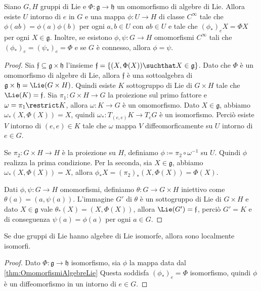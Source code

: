 \begin{theorem}\label{thm:OmomorfismiAlgebreLie}
	Siano $G,H$ gruppi di Lie e $\Phi: \mathfrak g \to \mathfrak h$ un omomorfismo di algebre di Lie. Allora esiste $U$ intorno di $e$ in $G$ e una mappa $\phi: U \to H$ di classe $C^\infty$ tale che $\phi(ab) = \phi(a) \phi(b)$ per ogni $a,b \in U$ con $ab \in U$ e tale che $(\phi_*)_e X = \Phi X$ per ogni $X\in\mathfrak g$.
	Inoltre, se esistono $\phi,\psi : G \to H$ omomorfismi $C^\infty$ tali che $(\phi_*)_e = (\psi_*)_e = \Phi$ e se $G$ è connesso, allora $\phi = \psi$.
\end{theorem}
\begin{proof}
	Sia $\mathfrak f \subseteq \mathfrak g \times \mathfrak h$ l'insieme $\mathfrak f = \{ (X,\Phi(X)) \suchthat X \in \mathfrak g \}$.
	Dato che $\Phi$ è un omomorfismo di algebre di Lie, allora $\mathfrak f$ è una sottoalgebra di $\mathfrak g \times \mathfrak h = \Lie(G\times H)$.
	Quindi esiste $K$ sottogruppo di Lie di $G\times H$ tale che $\Lie(K) = \mathfrak f$.
	Sia $\pi_1:G\times H \to G$ la proiezione sul primo fattore e $\omega = \pi_1\restrict K$, allora $\omega: K \to G$ è un omomorfismo.
	Dato $X\in \mathfrak g$, abbiamo $\omega_*(X,\Phi(X)) = X$, quindi $\omega_*:T_{(e,e)}K\to T_e G$ è un isomorfismo.
	Perciò esiste $V$ intorno di $(e,e) \in K$ tale che $\omega$ mappa $V$ diffeomorficamente su $U$ intorno di $e\in G$.
	
	Se $\pi_2 : G\times H \to H$ è la proiezione su $H$, definiamo $\phi \coloneqq \pi_2 \circ \omega^{-1}$ su $U$. Quindi $\phi$ realizza la prima condizione. Per la seconda, sia $X\in\mathfrak g$, abbiamo $\omega_*(X,\Phi(X)) = X$, allora $\phi_*X = (\pi_2)_*(X,\Phi(X)) =\Phi(X)$.
	
	Dati $\phi,\psi:G\to H$ omomorfismi, definiamo $\theta:G \to G\times H$ iniettivo come $\theta(a) = (a,\psi(a))$. L'immagine $G'$ di $\theta$ è un sottogruppo di Lie di $G\times H$ e dato $X \in \mathfrak g$ vale $\theta_*(X) = (X,\Phi(X))$, allora $\Lie(G') = \mathfrak f$, perciò $G'=K$ e di conseguenza $\psi(a) = \phi(a)$ per ogni $a \in G$. 
\end{proof}



\begin{corollary} \label{cor:AlgebreIsomorfeLocIsomorfi}
	Se due gruppi di Lie hanno algebre di Lie isomorfe, allora sono localmente isomorfi.
\end{corollary}
\begin{proof}
	Dato $\Phi: \mathfrak g \to \mathfrak h$ isomorfismo, sia $\phi$ la mappa data dal \cref{thm:OmomorfismiAlgebreLie}
	Questa soddisfa $(\phi_*)_e = \Phi$ isomorfismo, quindi $\phi$ è un diffeomorfismo in un intorno di $e \in G$.
\end{proof}



